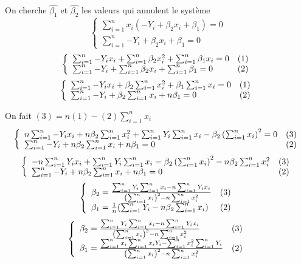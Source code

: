 \documentclass[pdflatex]{article}
\theoremstyle{definition}
\begin{document}
On cherche $\hat{\beta_1}$ et $\hat{\beta_2}$ les valeurs qui annulent le syst\`eme
$$
\left\{
\begin{array}{l}
\sum_{i=1}^{n}{x_i(-Y_i+\beta_2x_i+\beta_1)} = 0 \\
\sum_{i=1}^{n}{-Y_i+\beta_2x_i+\beta_1} = 0
\end{array}
\right.
$$
$$
\left\{
\begin{array}{l l}
\sum_{i=1}^{n}{-Y_ix_i}+\sum_{i=1}^{n}{\beta_2x_i^2}+\sum_{i=1}^{n}{\beta_1x_i} = 0 & (1)\\
\sum_{i=1}^{n}{-Y_i} +\sum_{i=1}^{n}{\beta_2x_i}+\sum_{i=1}^{n}{\beta_1} = 0 & (2)
\end{array}
\right.
$$
$$
\left\{
\begin{array}{l l}
\sum_{i=1}^{n}{-Y_ix_i}+\beta_2\sum_{i=1}^{n}{x_i^2}+\beta_1\sum_{i=1}^{n}{x_i} = 0 & (1)\\
\sum_{i=1}^{n}{-Y_i} +\beta_2\sum_{i=1}^{n}{x_i}+n\beta_1 = 0 & (2)
\end{array}
\right.
$$


On fait $(3) = n(1)-(2)\sum_{i=1}^{n}{x_i}$
$$
\left\{
\begin{array}{l l}
n\sum_{i=1}^{n}{-Y_ix_i}+n\beta_2\sum_{i=1}^{n}{x_i^2}+\sum_{i=1}^{n}{Y_i}\sum_{i=1}^{n}{x_i} -\beta_2\left(\sum_{i=1}^{n}{x_i}\right)^2 = 0 & (3)\\
\sum_{i=1}^{n}{-Y_i} +n\beta_2\sum_{i=1}^{n}{x_i}+n\beta_1 = 0 & (2)
\end{array}
\right.
$$
$$
\left\{
\begin{array}{l l}
-n\sum_{i=1}^{n}{Y_ix_i} + \sum_{i=1}^{n}{Y_i}\sum_{i=1}^{n}{x_i} = \beta_2\left(\sum_{i=1}^{n}{x_i}\right)^2 -n\beta_2\sum_{i=1}^{n}{x_i^2}  & (3)\\
\sum_{i=1}^{n}{-Y_i} +n\beta_2\sum_{i=1}^{n}{x_i}+n\beta_1 = 0 & (2)
\end{array}
\right.
$$
$$
\left\{
\begin{array}{l l}
\beta_2 = \frac{\sum_{i=1}^{n}{Y_i}\sum_{i=1}^{n}{x_i}-n\sum_{i=1}^{n}{Y_ix_i}}{\left(\sum_{i=1}^{n}{x_i}\right)^2 -n\sum_{i=1}^{n}{x_i^2}}  & (3)\\
\beta_1 = \frac{1}{n}(\sum_{i=1}^{n}{Y_i} - n\beta_2\sum_{i=1}^{n}{x_i}) & (2)
\end{array}
\right.
$$
$$
\left\{
\begin{array}{l l}
\beta_2 = \frac{\sum_{i=1}^{n}{Y_i}\sum_{i=1}^{n}{x_i}-n\sum_{i=1}^{n}{Y_ix_i}}{\left(\sum_{i=1}^{n}{x_i}\right)^2 -n\sum_{i=1}^{n}{x_i^2}}  & (3)\\
\beta_1 = \frac{\sum_{i=1}^{n}{x_i}\sum_{i=1}^{n}{x_iY_i}-\sum_{i=1}^{n}{x_i^2}\sum_{i=1}^{n}{Y_i}}{\left(\sum_{i=1}^{n}{x_i}\right)^2 -n\sum_{i=1}^{n}{x_i^2}} & (2)
\end{array}
\right.
$$
\end{document}
